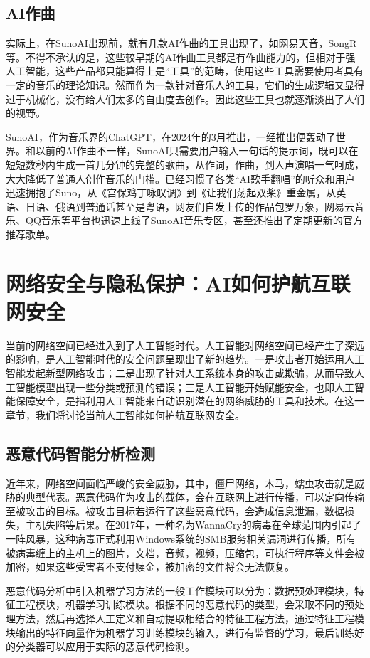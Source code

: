 \subsection{AI作曲}
实际上，在SunoAI出现前，就有几款AI作曲的工具出现了，如网易天音，SongR等。不得不承认的是，这些较早期的AI作曲工具都是有作曲能力的，但相对于强人工智能，这些产品都只能算得上是“工具”的范畴，使用这些工具需要使用者具有一定的音乐的理论知识。然而作为一款针对音乐人的工具，它们的生成逻辑又显得过于机械化，没有给人们太多的自由度去创作。因此这些工具也就逐渐淡出了人们的视野。

SunoAI，作为音乐界的ChatGPT，在2024年的3月推出，一经推出便轰动了世界。和以前的AI作曲不一样，SunoAI只需要用户输入一句话的提示词，既可以在短短数秒内生成一首几分钟的完整的歌曲，从作词，作曲，到人声演唱一气呵成，大大降低了普通人创作音乐的门槛。已经习惯了各类“AI歌手翻唱”的听众和用户迅速拥抱了Suno，从《宫保鸡丁咏叹调》到《让我们荡起双桨》重金属，从英语、日语、俄语到普通话甚至是粤语，网友们自发上传的作品包罗万象，网易云音乐、QQ音乐等平台也迅速上线了SunoAI音乐专区，甚至还推出了定期更新的官方推荐歌单。

\section[网络安全与隐私保护]{网络安全与隐私保护：AI如何护航互联网安全}
当前的网络空间已经进入到了人工智能时代。人工智能对网络空间已经产生了深远的影响，是人工智能时代的安全问题呈现出了新的趋势。一是攻击者开始运用人工智能发起新型网络攻击；二是出现了针对人工系统本身的攻击或欺骗，从而导致人工智能模型出现一些分类或预测的错误；三是人工智能开始赋能安全，也即人工智能保障安全，是指利用人工智能来自动识别潜在的网络威胁的工具和技术。在这一章节，我们将讨论当前人工智能如何护航互联网安全。

\subsection{恶意代码智能分析检测}
近年来，网络空间面临严峻的安全威胁，其中，僵尸网络，木马，蠕虫攻击就是威胁的典型代表。恶意代码作为攻击的载体，会在互联网上进行传播，可以定向传输至被攻击的目标。被攻击目标若运行了这些恶意代码，会造成信息泄漏，数据损失，主机失陷等后果。在2017年，一种名为WannaCry的病毒在全球范围内引起了一阵风暴，这种病毒正式利用Windows系统的SMB服务相关漏洞进行传播，所有被病毒缠上的主机上的图片，文档，音频，视频，压缩包，可执行程序等文件会被加密，如果这些受害者不支付赎金，被加密的文件将会无法恢复。

恶意代码分析中引入机器学习方法的一般工作模块可以分为：数据预处理模块，特征工程模块，机器学习训练模块。根据不同的恶意代码的类型，会采取不同的预处理方法，然后再选择人工定义和自动提取相结合的特征工程方法，通过特征工程模块输出的特征向量作为机器学习训练模块的输入，进行有监督的学习，最后训练好的分类器可以应用于实际的恶意代码检测。

